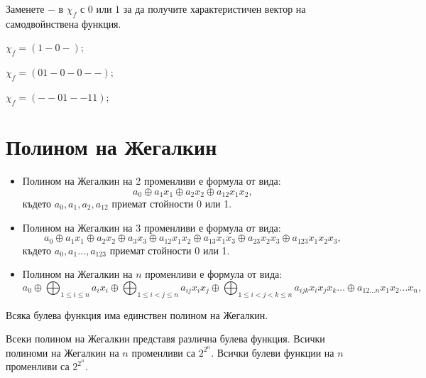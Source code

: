 \begin{problem}
  Заменете $-$ в $\chi_f$ с $0$ или $1$ за да получите характеристичен вектор на самодвойнствена функция.\\
  \begin{inparaenum}[a)]
  \item
    $\chi_f = (1-0-)$;
  \item
    $\chi_f = (01-0-0--)$;
  \item
    $\chi_f = (--01--11)$;
  \end{inparaenum}
\end{problem}

\section{Полином на Жегалкин}

\begin{itemize}
\item 
  Полином на Жегалкин на 2 променливи е формула от вида:
  \[a_0\oplus a_1x_1\oplus a_2x_2  \oplus a_{12}x_1x_2  ,\]
  където $a_0,a_1,a_2,a_{12}$ приемат стойности 0 или 1.
\item
  Полином на Жегалкин на 3 променливи е формула от вида:
  \[a_0\oplus a_1x_1\oplus a_2x_2 \oplus a_3x_3 \oplus a_{12}x_1x_2 \oplus a_{13}x_1x_3 \oplus a_{23} x_2x_3 \oplus a_{123}x_1x_2x_3,\]  
  където $a_0,a_1\dots,a_{123}$ приемат стойности 0 или 1.
\item
  Полином на Жегалкин на $n$ променливи е формула от вида:
  \[a_0 \oplus \bigoplus_{1\leq i\leq n}a_i x_i\oplus \bigoplus_{1\leq i<j \leq n}a_{ij} x_ix_j\oplus \bigoplus_{1\leq i<j<k \leq n}a_{ijk} x_ix_jx_k \dots  \oplus a_{12\dots n} x_1x_2\dots x_n,\]
\end{itemize}

\begin{thm}
  Всяка булева функция има единствен полином на Жегалкин.
\end{thm}
\begin{hint}
  Всеки полином на Жегалкин представя различна булева функция.
  Всички полиноми на Жегалкин на $n$ променливи са $2^{2^n}$.
  Всички булеви функции на $n$ променливи са $2^{2^n}$.
\end{hint}


